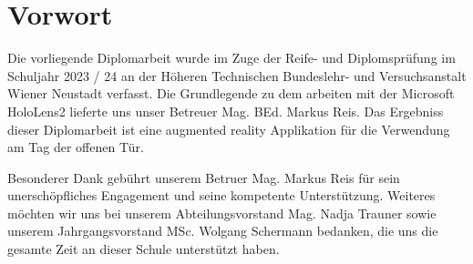 \chapter{Vorwort}

Die vorliegende Diplomarbeit wurde im Zuge der Reife- und Diplomsprüfung 
im Schuljahr 2023 / 24 an der Höheren Technischen Bundeslehr- und Versuchsanstalt
Wiener Neustadt verfasst. Die Grundlegende zu dem arbeiten mit der Microsoft HoloLens2
lieferte uns unser Betreuer Mag. BEd. Markus Reis. Das Ergebniss dieser Diplomarbeit
ist eine augmented reality Applikation für die Verwendung am Tag der offenen Tür.

Besonderer Dank gebührt unserem Betruer Mag. Markus Reis  für sein unerschöpfliches
Engagement und seine kompetente Unterstützung. Weiteres möchten wir uns bei unserem 
Abteilungsvorstand Mag. Nadja Trauner sowie unserem Jahrgangsvorstand MSc. Wolgang
Schermann bedanken, die uns die gesamte Zeit an dieser Schule unterstützt haben.




